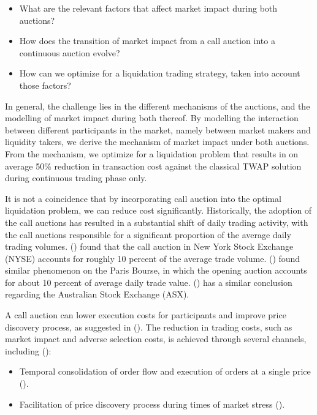 \begin{itemize}
  \item What are the relevant factors that affect market impact during both auctions?
  \item How does the transition of market impact from a call auction into a continuous auction evolve?
  \item How can we optimize for a liquidation trading strategy, taken into account those factors?
\end{itemize}

In general, the challenge lies in the different mechanisms of the auctions, and the modelling of market impact during both thereof. By modelling the interaction between different participants in the market, namely between market makers and liquidity takers, we derive the mechanism of market impact under both auctions. From the mechanism, we optimize for a liquidation problem that results in on average 50\% reduction in transaction cost against the classical TWAP solution during continuous trading phase only.

It is not a coincidence that by incorporating call auction into the optimal liquidation problem, we can reduce cost significantly. Historically, the adoption of the call auctions has resulted in a substantial shift of daily trading activity, with the call auctions responsible for a significant proportion of the average daily trading volumes. (\cite{Madhavan2015}) found that the call auction in New York Stock Exchange (NYSE) accounts for roughly 10 percent of the average trade volume. (\cite{Bruno1999}) found similar phenomenon on the Paris Bourse, in which the opening auction accounts for about 10 percent of average daily trade value. (\cite{Carole2006}) has a similar conclusion regarding the Australian Stock Exchange (ASX).

A call auction can lower execution costs for participants and improve price discovery process, as suggested in (\cite{Pagano2003}). The reduction in trading costs, such as market impact and adverse selection costs, is achieved through several channels, including (\cite{Carole2006}):

\begin{itemize}
  \item Temporal consolidation of order flow and execution of orders at a single price (\cite{Economides1995}).
  \item Facilitation of price discovery process during times of market stress (\cite{Madhavan1992}).
\end{itemize}


